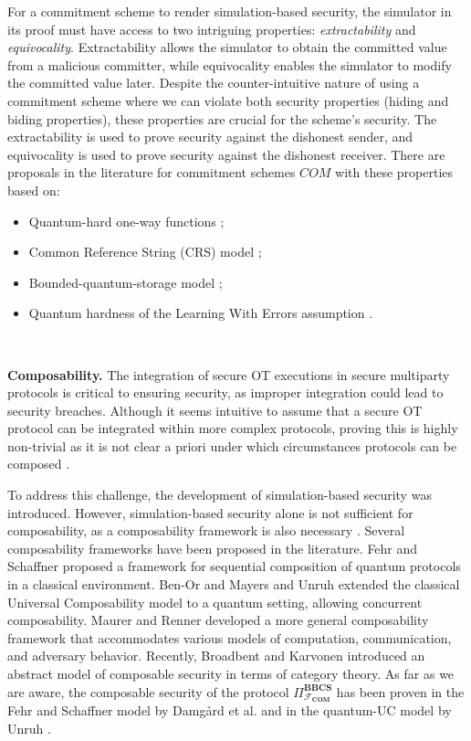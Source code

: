 For a commitment scheme to render simulation-based security, the simulator in its proof must have access to two intriguing properties: \textit{extractability} and \textit{equivocality}. Extractability allows the simulator to obtain the committed value from a malicious committer, while equivocality enables the simulator to modify the committed value later. Despite the counter-intuitive nature of using a commitment scheme where we can violate both security properties (hiding and biding properties), these properties are crucial for the scheme's security. The extractability is used to prove security against the dishonest sender, and equivocality is used to prove security against the dishonest receiver. There are proposals in the literature for commitment schemes $COM$ with these properties based on:

\begin{itemize}
    \item Quantum-hard one-way functions \cite{BCKM21, GLSV21};
    \item Common Reference String (CRS) model \cite{U10, CF01};
    \item Bounded-quantum-storage model \cite{U11};
    \item Quantum hardness of the Learning With Errors assumption \cite{DFLSS09}.
\end{itemize}

\

\noindent\textbf{Composability.} The integration of secure OT executions in secure multiparty protocols \cite{Y86} is critical to ensuring security, as improper integration could lead to security breaches. Although it seems intuitive to assume that a secure OT protocol can be integrated within more complex protocols, proving this is highly non-trivial as it is not clear a priori under which circumstances protocols can be composed \cite{MR09}. 

To address this challenge, the development of simulation-based security was introduced. However, simulation-based security alone is not sufficient for composability, as a composability framework is also necessary \cite{MR09}. Several composability frameworks have been proposed in the literature. Fehr and Schaffner \cite{FS09} proposed a framework for sequential composition of quantum protocols in a classical environment. Ben-Or and Mayers \cite{BM04} and Unruh \cite{U04, U10} extended the classical Universal Composability model \cite{C20} to a quantum setting, allowing concurrent composability. Maurer and Renner \cite{MR11} developed a more general composability framework that accommodates various models of computation, communication, and adversary behavior. Recently, Broadbent and Karvonen \cite{BK22} introduced an abstract model of composable security in terms of category theory. As far as we are aware, the composable security of the protocol $\Pi^{\textbf{BBCS}}_{\mathcal{F}_{\textbf{COM}}}$ has been proven in the Fehr and Schaffner model \cite{FS09} by Damg{\aa}rd et al. \cite{DFLSS09} and in the quantum-UC model by Unruh \cite{U10}.



